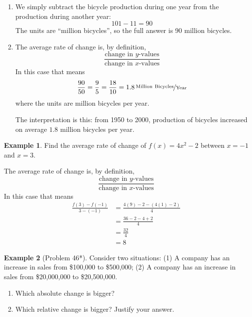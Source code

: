 \documentclass[oneside]{book}
\theoremstyle{definition}
\newtheorem{example}{Example}
\theoremstyle{solution}
\newtheorem*{solution}{Solution}
\newenvironment{solution}{\vspace{2in}\comment}{\endcomment}
\begin{document}
\begin{solution}
  \begin{enumerate}
  \item We simply subtract the bicycle production during one year from
    the production during another year:
$$
101-11 = 90
$$
The units are ``million bicycles'', so the full answer is 90 million
bicycles.  

  \item 
The average rate of change is, by definition, 
$$
\frac{\text{change in $y$-values}}{\text{change in $x$-values}}
$$
In this case that means 
$$
\dfrac{90}{50} = \frac{9}{5} = \frac{18}{10} = \unitfrac[1.8]{Million\ Bicycles}{Year}
$$
where the units are million bicycles per year.

The interpretation is this: from 1950 to 2000, production of bicycles
increased on average $1.8$ million bicycles per year.  
\end{enumerate}
\end{solution}


\begin{example}
Find the average rate of change of $f(x) = 4x^2-2$ between $x = -1$ and
$x=3$.
\end{example}

\begin{solution}
The average rate of change is, by definition, 
$$
\frac{\text{change in $y$-values}}{\text{change in $x$-values}}
$$
In this case that means 
  \begin{align*}
    \frac{f(3) - f(-1)}{3 - (-1)} &= \frac{4(9) - 2 - (4(1) - 2)}{4} \\
                                  & = \frac{36 - 2 - 4 + 2}{4} \\
                                  & = \frac{32}{4} \\ 
                                  & = \boxed{8}
  \end{align*}
\end{solution}


\begin{example}[Problem 46*]
  Consider two situations: (1) A company has an increase in sales from
  \$100,000 to \$500,000; (2) A company has an increase in sales from
  \$20,000,000 to \$20,500,000.

\begin{enumerate}
\item Which absolute change is bigger?
\item Which relative change is bigger?  Justify your answer.
\end{enumerate}
\end{example}
\end{document}
